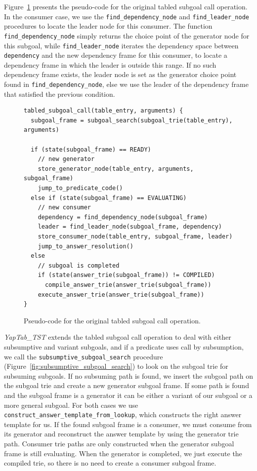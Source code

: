 Figure~\ref{fig:tabled_subgoal_call} presents the pseudo-code for the original tabled subgoal call operation.
In the consumer case, we use the \texttt{find\_dependency\_node} and \texttt{find\_leader\_node} procedures
to locate the leader node for this consumer. The function \texttt{find\_dependency\_node} simply
returns the choice point of the generator node for this subgoal, while \texttt{find\_leader\_node}
iterates the dependency space between \texttt{dependency} and the new dependency frame for this consumer,
to locate a dependency frame in which the leader is outside this range. If no such dependency frame
exists, the leader node is set as the generator choice point found in \texttt{find\_dependency\_node},
else we use the leader of the dependency frame that satisfied the previous condition. \cite{Rocha-PhD}

\begin{figure}[ht]
\begin{Verbatim}
tabled_subgoal_call(table_entry, arguments) {
  subgoal_frame = subgoal_search(subgoal_trie(table_entry), arguments)
  
  if (state(subgoal_frame) == READY)
    // new generator
    store_generator_node(table_entry, arguments, subgoal_frame)
    jump_to_predicate_code()
  else if (state(subgoal_frame) == EVALUATING)
    // new consumer
    dependency = find_dependency_node(subgoal_frame)
    leader = find_leader_node(subgoal_frame, dependency)
    store_consumer_node(table_entry, subgoal_frame, leader)
    jump_to_answer_resolution()
  else
    // subgoal is completed
    if (state(answer_trie(subgoal_frame)) != COMPILED)
      compile_answer_trie(answer_trie(subgoal_frame))
    execute_answer_trie(answer_trie(subgoal_frame))
}
\end{Verbatim}
\caption{Pseudo-code for the original tabled subgoal call operation.}
\label{fig:tabled_subgoal_call}
\end{figure}

\textit{YapTab\_TST} extends the tabled subgoal call operation to deal with either subsumptive and variant subgoals,
and if a predicate uses call by subsumption, we call the \texttt{subsumptive\_subgoal\_search} procedure
(Figure~\ref{fig:subsumptive_subgoal_search}) to look on the subgoal trie for subsuming subgoals.
If no subsuming path is found, we insert the subgoal path on the subgoal trie and create a new generator
subgoal frame. If some path is found and the subgoal frame is a generator it can be either
a variant of our subgoal or a more general subgoal. For both cases
we use \texttt{construct\_answer\_template\_from\_lookup}, which constructs the right answer template for us.
If the found subgoal frame is a consumer, we must consume from its generator and reconstruct the answer
template by using the generator trie path.
Consumer trie paths are only constructed when the generator subgoal frame is still evaluating.
When the generator is completed, we just execute the compiled trie, so there is no need
to create a consumer subgoal frame.

